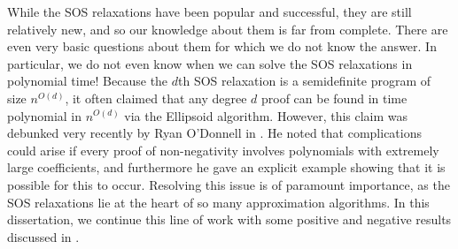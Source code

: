 While the SOS relaxations have been popular and successful, they are still relatively new, and so our knowledge about them is far from complete.
There are even very basic questions about them for which we do not know the answer.
In particular, we do not even know when we can solve the SOS relaxations in polynomial time!
Because the $d$th SOS relaxation is a semidefinite program of size $n^{O(d)}$, it often claimed that any degree $d$ proof can be found in time polynomial in $n^{O(d)}$ via the Ellipsoid algorithm. However, this claim was debunked very recently by Ryan O'Donnell in \cite{ODon16}.
He noted that complications could arise if every proof of non-negativity involves polynomials with extremely large coefficients, and furthermore he gave an explicit example showing that it is possible for this to occur.
Resolving this issue is of paramount importance, as the SOS relaxations lie at the heart of so many approximation algorithms.
In this dissertation, we continue this line of work with some positive and negative results discussed in .


